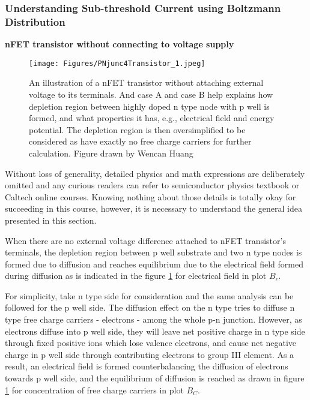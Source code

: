 \subsubsection{Understanding Sub-threshold Current using Boltzmann Distribution}
\textbf{nFET transistor without connecting to voltage supply}
\begin{figure}[H]
    \centering
    \texttt{[image: Figures/PNjunc4Transistor\_1.jpeg]}
    \caption{An illustration of a nFET transistor without attaching external voltage to its terminals. And case A and case B help explains how depletion region between highly doped n type node with p well is formed, and what properties it has, e.g., electrical field and energy potential. The depletion region is then oversimplified to be considered as have exactly no free charge carriers for further calculation. Figure drawn by Wencan Huang}
    \label{fig:342_transistor_1}
\end{figure}

Without loss of generality, detailed physics and math expressions are deliberately omitted and any curious readers can refer to semiconductor physics textbook or Caltech online courses. Knowing nothing about those details is totally okay for succeeding in this course, however, it is necessary to understand the general idea presented in this section. 

When there are no external voltage difference attached to nFET transistor's terminals, the depletion region between p well substrate and two n type nodes is formed due to diffusion and reaches equilibrium due to the electrical field formed during diffusion as is indicated in the figure \ref{fig:342_transistor_1} for electrical field in plot \(B_\epsilon\). 

For simplicity, take n type side for consideration and the same analysis can be followed for the p well side. The diffusion effect on the n type tries to diffuse n type free charge carriers - electrons - among the whole p-n junction. However, as electrons diffuse into p well side, they will leave net positive charge in n type side through fixed positive ions which lose valence electrons, and cause net negative charge in p well side through contributing electrons to group III element. As a result, an electrical field is formed counterbalancing the diffusion of electrons towards p well side, and the equilibrium of diffusion is reached as drawn in figure \ref{fig:342_transistor_1} for concentration of free charge carriers in plot \(B_C\). 

